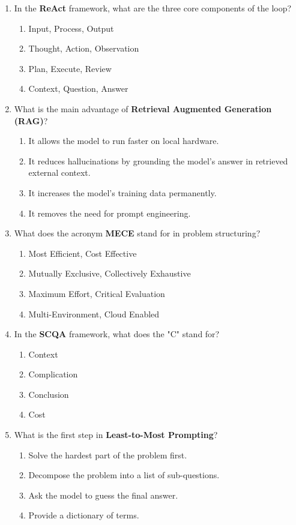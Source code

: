 \documentclass[11pt,a4paper]{article}
\begin{document}
\begin{enumerate}[leftmargin=*, label=\textbf{\#\arabic*}]
  \item In the \textbf{ReAct} framework, what are the three core components of the loop?
    \begin{enumerate}[label=\Alph*)]
      \item Input, Process, Output
      \item Thought, Action, Observation
      \item Plan, Execute, Review
      \item Context, Question, Answer
    \end{enumerate}

  \item What is the main advantage of \textbf{Retrieval Augmented Generation (RAG)}?
    \begin{enumerate}[label=\Alph*)]
      \item It allows the model to run faster on local hardware.
      \item It reduces hallucinations by grounding the model's answer in retrieved external context.
      \item It increases the model's training data permanently.
      \item It removes the need for prompt engineering.
    \end{enumerate}

  \item What does the acronym \textbf{MECE} stand for in problem structuring?
    \begin{enumerate}[label=\Alph*)]
      \item Most Efficient, Cost Effective
      \item Mutually Exclusive, Collectively Exhaustive
      \item Maximum Effort, Critical Evaluation
      \item Multi-Environment, Cloud Enabled
    \end{enumerate}

  \item In the \textbf{SCQA} framework, what does the "C" stand for?
    \begin{enumerate}[label=\Alph*)]
      \item Context
      \item Complication
      \item Conclusion
      \item Cost
    \end{enumerate}

  \item What is the first step in \textbf{Least-to-Most Prompting}?
    \begin{enumerate}[label=\Alph*)]
      \item Solve the hardest part of the problem first.
      \item Decompose the problem into a list of sub-questions.
      \item Ask the model to guess the final answer.
      \item Provide a dictionary of terms.
    \end{enumerate}


\end{enumerate}
\end{document}
